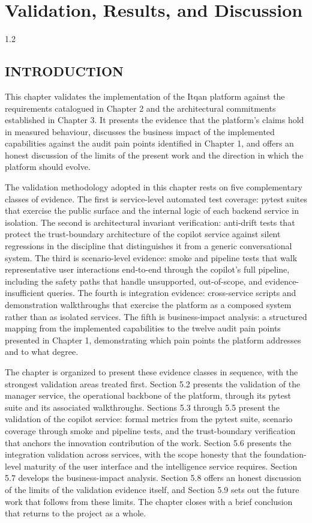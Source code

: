 \chapter{Validation, Results, and Discussion}
\begin{spacing}{1.2}
\minitoc
\thispagestyle{MyStyle}
\end{spacing}
\newpage

\section{INTRODUCTION}
This chapter validates the implementation of the Itqan platform against the requirements catalogued in Chapter 2 and the architectural commitments established in Chapter 3. It presents the evidence that the platform's claims hold in measured behaviour, discusses the business impact of the implemented capabilities against the audit pain points identified in Chapter 1, and offers an honest discussion of the limits of the present work and the direction in which the platform should evolve.

The validation methodology adopted in this chapter rests on five complementary classes of evidence. The first is service-level automated test coverage: pytest suites that exercise the public surface and the internal logic of each backend service in isolation. The second is architectural invariant verification: anti-drift tests that protect the trust-boundary architecture of the copilot service against silent regressions in the discipline that distinguishes it from a generic conversational system. The third is scenario-level evidence: smoke and pipeline tests that walk representative user interactions end-to-end through the copilot's full pipeline, including the safety paths that handle unsupported, out-of-scope, and evidence-insufficient queries. The fourth is integration evidence: cross-service scripts and demonstration walkthroughs that exercise the platform as a composed system rather than as isolated services. The fifth is business-impact analysis: a structured mapping from the implemented capabilities to the twelve audit pain points presented in Chapter 1, demonstrating which pain points the platform addresses and to what degree.

The chapter is organized to present these evidence classes in sequence, with the strongest validation areas treated first. Section 5.2 presents the validation of the manager service, the operational backbone of the platform, through its pytest suite and its associated walkthroughs. Sections 5.3 through 5.5 present the validation of the copilot service: formal metrics from the pytest suite, scenario coverage through smoke and pipeline tests, and the trust-boundary verification that anchors the innovation contribution of the work. Section 5.6 presents the integration validation across services, with the scope honesty that the foundation-level maturity of the user interface and the intelligence service requires. Section 5.7 develops the business-impact analysis. Section 5.8 offers an honest discussion of the limits of the validation evidence itself, and Section 5.9 sets out the future work that follows from these limits. The chapter closes with a brief conclusion that returns to the project as a whole.

